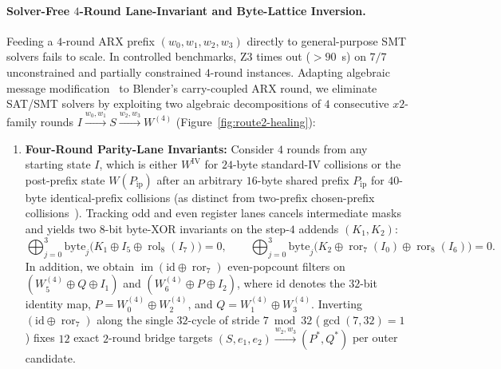 \documentclass[11pt,a4paper]{article}
\theoremstyle{definition}
\theoremstyle{remark}
\newcommand{\ror}{\operatorname{ror}}
\newcommand{\rol}{\operatorname{rol}}
\newcommand{\im}{\operatorname{im}}
\begin{document}
\paragraph{Solver-Free $4$-Round Lane-Invariant and Byte-Lattice Inversion.}
Feeding a $4$-round ARX prefix $(w_0, w_1, w_2, w_3)$ directly to general-purpose SMT solvers fails to scale. In controlled benchmarks, Z3 times out ($> 90$~s) on $7 / 7$ unconstrained and partially constrained $4$-round instances. Adapting algebraic message modification~\cite{WY05} to Blender's carry-coupled ARX round, we eliminate SAT/SMT solvers by exploiting two algebraic decompositions of $4$ consecutive $x2$-family rounds $I \xrightarrow{w_0, w_1} S \xrightarrow{w_2, w_3} W^{(4)}$ (Figure~\ref{fig:route2-healing}):
\begin{enumerate}[leftmargin=2em]
    \item \textbf{Four-Round Parity-Lane Invariants:} Consider $4$ rounds from any starting state $I$, which is either $W^{\mathrm{IV}}$ for $24$-byte standard-IV collisions or the post-prefix state $W(P_{\mathrm{ip}})$ after an arbitrary $16$-byte shared prefix $P_{\mathrm{ip}}$ for $40$-byte identical-prefix collisions (as distinct from two-prefix chosen-prefix collisions~\cite{SLdW07}). Tracking odd and even register lanes cancels intermediate masks and yields two $8$-bit byte-XOR invariants on the step-$4$ addends $(K_1, K_2)$:
    \[
        \bigoplus_{j=0}^{3} \mathrm{byte}_j\bigl(K_1 \oplus I_5 \oplus \rol_8(I_7)\bigr) = 0, \qquad
        \bigoplus_{j=0}^{3} \mathrm{byte}_j\bigl(K_2 \oplus \ror_7(I_0) \oplus \ror_8(I_6)\bigr) = 0.
    \]
    In addition, we obtain $\im(\mathrm{id} \oplus \ror_7)$ even-popcount filters on $(W^{(4)}_5 \oplus Q \oplus I_1)$ and $(W^{(4)}_6 \oplus P \oplus I_2)$, where $\mathrm{id}$ denotes the $32$-bit identity map, $P = W^{(4)}_0 \oplus W^{(4)}_2$, and $Q = W^{(4)}_1 \oplus W^{(4)}_3$. Inverting $(\mathrm{id} \oplus \ror_7)$ along the single $32$-cycle of stride $7 \bmod 32$ ($\gcd(7, 32) = 1$) fixes $12$ exact $2$-round bridge targets $(S, e_1, e_2) \xrightarrow{w_2, w_3} (P^*, Q^*)$ per outer candidate.

\end{enumerate}
\end{document}
